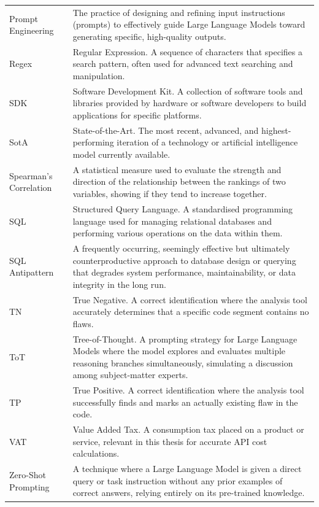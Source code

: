 \begin{longtable}{p{3cm}p{10cm}}
Prompt \newline Engineering & The practice of designing and refining input instructions (prompts) to effectively guide Large Language Models toward generating specific, high-quality outputs.\\
Regex & Regular Expression. A sequence of characters that specifies a search pattern, often used for advanced text searching and manipulation.\\
SDK & Software Development Kit. A collection of software tools and libraries provided by hardware or software developers to build applications for specific platforms.\\
SotA & State-of-the-Art. The most recent, advanced, and highest-performing iteration of a technology or artificial intelligence model currently available.\\
Spearman's \newline Correlation & A statistical measure used to evaluate the strength and direction of the relationship between the rankings of two variables, showing if they tend to increase together.\\
SQL & Structured Query Language. A standardised programming language used for managing relational databases and performing various operations on the data within them.\\
SQL Antipattern & A frequently occurring, seemingly effective but ultimately counterproductive approach to database design or querying that degrades system performance, maintainability, or data integrity in the long run.\\
TN & True Negative. A correct identification where the analysis tool accurately determines that a specific code segment contains no flaws.\\
ToT & Tree-of-Thought. A prompting strategy for Large Language Models where the model explores and evaluates multiple reasoning branches simultaneously, simulating a discussion among subject-matter experts.\\
TP & True Positive. A correct identification where the analysis tool successfully finds and marks an actually existing flaw in the code.\\
VAT & Value Added Tax. A consumption tax placed on a product or service, relevant in this thesis for accurate API cost calculations.\\
Zero-Shot \newline Prompting & A technique where a Large Language Model is given a direct query or task instruction without any prior examples of correct answers, relying entirely on its pre-trained knowledge.\\
\end{longtable}
\addtocounter{table}{-1} %